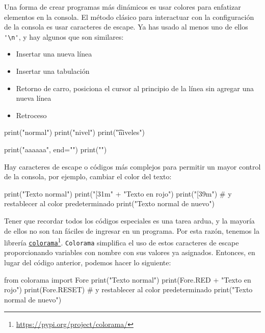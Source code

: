 \documentclass[10pt,a4paper]{article}
\begin{document}
Una forma de crear programas más dinámicos es usar colores para enfatizar elementos en la consola. El método clásico para interactuar con la configuración de la consola es usar caracteres de escape. Ya has usado al menos uno de ellos \lstinline|'\n'|, y hay algunos que son similares:
\begin{itemize}
\itemsep0em 
\item[\texttt{\textbackslash n}:] Insertar una nueva línea
\item[\texttt{\textbackslash t}:] Insertar una tabulación
\item[\texttt{\textbackslash r}:] Retorno de carro, posiciona el cursor al principio de la línea sin agregar una nueva línea
\item[\texttt{\textbackslash b}:] Retroceso
\end{itemize}

\begin{attachedlisting}[escape]
print("normal")
print("\tUn nivel")
print("\t\tDos niveles")

print("aaaaaa", end="")
print("\rbbbbbb")
\end{attachedlisting}

Hay caracteres de escape o códigos más complejos para permitir un mayor control de la consola, por ejemplo, cambiar el color del texto:

\begin{attachedlisting}[red]
print("Texto normal")
print("[31m" + "Texto en rojo")
print("[39m") # y restablecer al color predeterminado
print("Texto normal de nuevo")
\end{attachedlisting}

Tener que recordar todos los códigos especiales es una tarea ardua, y la mayoría de ellos no son tan fáciles de ingresar en un programa. Por esta razón, tenemos la librería \href{https://pypi.org/project/colorama/}{\texttt{colorama}}\footnote{\href{https://pypi.org/project/colorama/}{https://pypi.org/project/colorama/}}. \texttt{Colorama} simplifica el uso de estos caracteres de escape proporcionando variables con nombre con sus valores ya asignados. Entonces, en lugar del código anterior, podemos hacer lo siguiente:

\begin{attachedlisting}[colorama]
from colorama import Fore
print("Texto normal")
print(Fore.RED + "Texto en rojo")
print(Fore.RESET) # y restablecer al color predeterminado
print("Texto normal de nuevo")
\end{attachedlisting}
\end{document}
